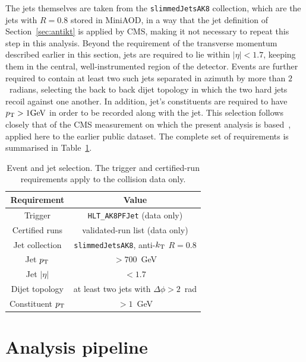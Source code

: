 The jets themselves are taken from the \texttt{slimmedJetsAK8} collection, which are the
\antikt{} jets with $R=0.8$ stored in MiniAOD, in a way that the jet definition of
Section~\ref{sec:antikt} is applied by CMS, making it not necessary to repeat this step in this analysis.
Beyond the requirement of the transverse momentum described earlier in this section, jets
are required to lie within $|\eta| < 1.7$, keeping them in the
central, well-instrumented region of the detector. Events are further required to
contain at least two such jets separated in azimuth by more than $2$~radians,
selecting the back to back dijet topology in which the two hard jets recoil
against one another. In addition, jet's constituents are required to have $p_{\mathrm{T}} > 1 \text{GeV}$ in
order to be recorded along with the jet. This selection follows closely that of the CMS measurement on
which the present analysis is based~\cite{CMS:2026jnt}, applied here to the
earlier public dataset. The complete set of requirements is summarised in
Table~\ref{tab:selection}.

\begin{table}[htbp]
  \centering
  \caption{Event and jet selection. The trigger and certified-run requirements
  apply to the collision data only.}
  \label{tab:selection}
  \begin{tabular}{cc}
    \toprule
    Requirement & Value \\
    \midrule
    Trigger        & \texttt{HLT\_AK8PFJet} (data only) \\
    Certified runs & validated-run list (data only) \\
    Jet collection & \texttt{slimmedJetsAK8}, anti-$k_{\mathrm{T}}$ $R=0.8$ \\
    Jet $p_{\mathrm{T}}$      & $> 700$~GeV \\
    Jet $|\eta|$   & $< 1.7$ \\
    Dijet topology & at least two jets with $\Delta\phi > 2$~rad \\
    Constituent $p_{\mathrm{T}}$ & $> 1$~GeV \\
    \bottomrule
  \end{tabular}
\end{table}

\section{Analysis pipeline}
\label{sec:pipeline}

